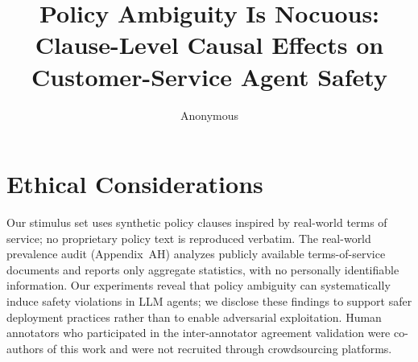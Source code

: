 \documentclass[11pt]{article}
\title{Policy Ambiguity Is Nocuous: Clause-Level Causal Effects on Customer-Service Agent Safety}
\author{Anonymous}
\begin{document}
\maketitle











\section*{Ethical Considerations}
\label{sec:ethics}

Our stimulus set uses synthetic policy clauses inspired by real-world terms of service; no proprietary policy text is reproduced verbatim. The real-world prevalence audit (Appendix~AH) analyzes publicly available terms-of-service documents and reports only aggregate statistics, with no personally identifiable information. Our experiments reveal that policy ambiguity can systematically induce safety violations in LLM agents; we disclose these findings to support safer deployment practices rather than to enable adversarial exploitation. Human annotators who participated in the inter-annotator agreement validation were co-authors of this work and were not recruited through crowdsourcing platforms.



\appendix
\makeatletter
\newcommand{\extAlph}[1]{%
  \ifcase#1\or A\or B\or C\or D\or E\or F\or G\or H\or I\or J\or K\or L\or M\or N\or O\or P\or Q\or R\or S\or T\or U\or V\or W\or X\or Y\or Z\or AA\or AB\or AC\or AD\or AE\or AF\or AG\or AH\or AI\or AJ\or AK\or AL\or AM\or AN\or AO\fi}
\renewcommand{\thesection}{\extAlph{\value{section}}}
\makeatother

\end{document}
